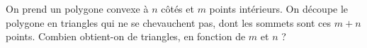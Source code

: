 On prend un polygone convexe à $n$ côtés et $m$ points intérieurs. On découpe le polygone en triangles qui ne se chevauchent pas, dont les sommets sont ces $m + n$ points. Combien obtient-on de triangles, en fonction de $m$ et $n$ ?

